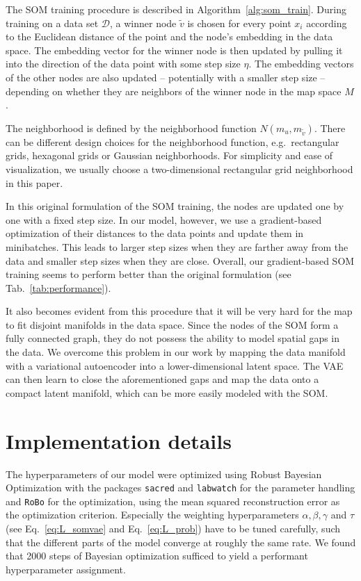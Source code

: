 The SOM training procedure is described in Algorithm~\ref{alg:som_train}.
During training on a data set $\mathcal{D}$, a winner node $\tilde{v}$ is chosen for every point $x_i$ according to the Euclidean distance of the point and the node's embedding in the data space.
The embedding vector for the winner node is then updated by pulling it into the direction of the data point with some step size $\eta$.
The embedding vectors of the other nodes are also updated -- potentially with a smaller step size -- depending on whether they are neighbors of the winner node in the map space $M$.

The neighborhood is defined by the neighborhood function $N(m_u, m_{\tilde{v}})$.
There can be different design choices for the neighborhood function, e.g.\ rectangular grids, hexagonal grids or Gaussian neighborhoods.
For simplicity and ease of visualization, we usually choose a two-dimensional rectangular grid neighborhood in this paper.

In this original formulation of the SOM training, the nodes are updated one by one with a fixed step size.
In our model, however, we use a gradient-based optimization of their distances to the data points and update them in minibatches.
This leads to larger step sizes when they are farther away from the data and smaller step sizes when they are close.
Overall, our gradient-based SOM training seems to perform better than the original formulation (see Tab.~\ref{tab:performance}).

It also becomes evident from this procedure that it will be very hard for the map to fit disjoint manifolds in the data space.
Since the nodes of the SOM form a fully connected graph, they do not possess the ability to model spatial gaps in the data.
We overcome this problem in our work by mapping the data manifold with a variational autoencoder into a lower-dimensional latent space.
The VAE can then learn to close the aforementioned gaps and map the data onto a compact latent manifold, which can be more easily modeled with the SOM.



\section{Implementation details}\label{sec:implementation}

The hyperparameters of our model were optimized using Robust Bayesian Optimization with the packages \texttt{sacred} and \texttt{labwatch} \citep{Greff2017a} for the parameter handling and \texttt{RoBo} \citep{Klein2017} for the optimization, using the mean squared reconstruction error as the optimization criterion.
Especially the weighting hyperparameters $\alpha, \beta, \gamma$ and $\tau$ (see Eq.~\eqref{eq:L_somvae} and Eq.~\eqref{eq:L_prob}) have to be tuned carefully, such that the different parts of the model converge at roughly the same rate.
We found that 2000 steps of Bayesian optimization sufficed to yield a performant hyperparameter assignment.

